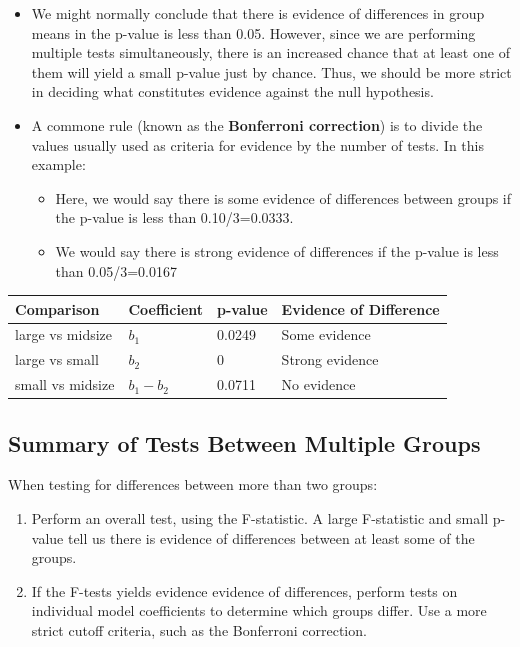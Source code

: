 \documentclass[]{book}
\providecommand{\tightlist}{%
  \setlength{\itemsep}{0pt}\setlength{\parskip}{0pt}}
\begin{document}
\begin{itemize}
\item
  We might normally conclude that there is evidence of differences in
  group means in the p-value is less than 0.05. However, since we are
  performing multiple tests simultaneously, there is an increased chance
  that at least one of them will yield a small p-value just by chance.
  Thus, we should be more strict in deciding what constitutes evidence
  against the null hypothesis.
\item
  A commone rule (known as the \textbf{Bonferroni correction}) is to
  divide the values usually used as criteria for evidence by the number
  of tests. In this example:

  \begin{itemize}
  \tightlist
  \item
    Here, we would say there is some evidence of differences between
    groups if the p-value is less than 0.10/3=0.0333.\\
  \item
    We would say there is strong evidence of differences if the p-value
    is less than 0.05/3=0.0167
  \end{itemize}
\end{itemize}

\begin{longtable}[]{@{}llll@{}}
\toprule
Comparison & Coefficient & p-value & Evidence of
Difference\tabularnewline
\midrule
\endhead
large vs midsize & \(b_1\) & 0.0249 & Some evidence\tabularnewline
large vs small & \(b_2\) & 0 & Strong evidence\tabularnewline
small vs midsize & \(b_1-b_2\) & 0.0711 & No evidence\tabularnewline
\bottomrule
\end{longtable}

\subsection{Summary of Tests Between Multiple
Groups}\label{summary-of-tests-between-multiple-groups}

When testing for differences between more than two groups:

\begin{enumerate}
\def\labelenumi{\arabic{enumi}.}
\tightlist
\item
  Perform an overall test, using the F-statistic. A large F-statistic
  and small p-value tell us there is evidence of differences between at
  least some of the groups.\\
\item
  If the F-tests yields evidence evidence of differences, perform tests
  on individual model coefficients to determine which groups differ. Use
  a more strict cutoff criteria, such as the Bonferroni correction.
\end{enumerate}
\end{document}
